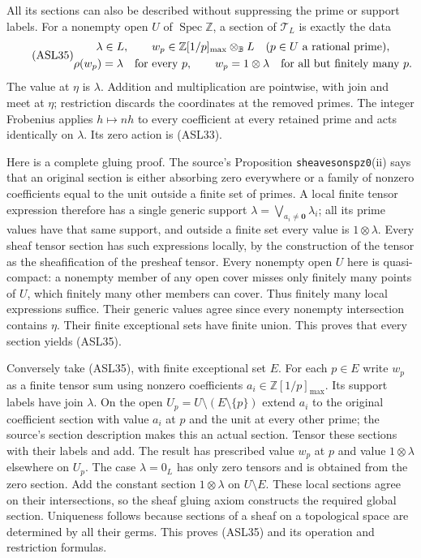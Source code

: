 All its sections can also be described without suppressing the prime
or support labels. For a nonempty open $U$ of
$\operatorname{Spec}\mathbb Z$, a section of $\mathcal T_L$ is
exactly the data
\begin{equation}\tag{ASL35}
 \begin{gathered}
 \lambda\in L,\qquad
 w_p\in\mathbb Z[1/p]_{\max}\otimes_{\mathbb B}L
                  \quad(p\in U\text{ a rational prime}),\\
 \rho(w_p)=\lambda\quad\hbox{for every }p,\qquad
 w_p=1\otimes\lambda\quad\hbox{for all but finitely many }p.
 \end{gathered}
\end{equation}
The value at $\eta$ is $\lambda$. Addition and multiplication are
pointwise, with join and meet at $\eta$; restriction discards the
coordinates at the removed primes. The integer Frobenius applies
$h\mapsto nh$ to every coefficient at every retained prime and
acts identically on $\lambda$. Its zero action is (ASL33).

Here is a complete gluing proof. The source's Proposition
\texttt{sheavesonspz0}(ii) says that an original section is either
absorbing zero everywhere or a family of nonzero coefficients
equal to the unit outside a finite set of primes. A local finite
tensor expression therefore has a single generic support
$\lambda=\bigvee_{a_i\ne\mathbf0}\lambda_i$; all its prime values
have that same support, and outside a finite set every value is
$1\otimes\lambda$. Every sheaf tensor section has such expressions
locally, by the construction of the tensor as the sheafification of
the presheaf tensor. Every nonempty open $U$ here is quasi-compact:
a nonempty member of any open cover misses only finitely many points
of $U$, which finitely many other members can cover. Thus finitely
many local expressions suffice. Their generic values agree since
every nonempty intersection contains $\eta$. Their finite exceptional
sets have finite union. This proves that every section yields (ASL35).

Conversely take (ASL35), with finite exceptional set $E$. For each
$p\in E$ write $w_p$ as a finite tensor sum using nonzero
coefficients $a_i\in\mathbb Z[1/p]_{\max}$. Its support labels
have join $\lambda$. On the open $U_p=U\setminus(E\setminus\{p\})$
extend $a_i$ to the original coefficient section with value $a_i$
at $p$ and the unit at every other prime; the source's section
description makes this an actual section. Tensor these sections
with their labels and add. The result has prescribed value $w_p$
at $p$ and value $1\otimes\lambda$ elsewhere on $U_p$.
The case $\lambda=0_L$ has only zero tensors and is obtained from
the zero section. Add the constant section $1\otimes\lambda$ on
$U\setminus E$. These local sections agree on their intersections,
so the sheaf gluing axiom constructs the required global section.
Uniqueness follows because sections of a sheaf on a topological
space are determined by all their germs. This proves (ASL35) and
its operation and restriction formulas.
